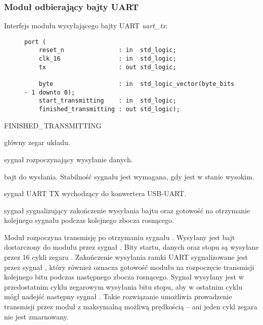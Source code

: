 \subsubsection{Moduł odbierający bajty UART}
Interfejs modułu wysyłającego bajty UART \textit{uart\_tx}:

\begin{figure}[!h]
\begin{lstlisting}[style=vhdl]
port (
	reset_n               : in  std_logic;
	clk_16                : in  std_logic;
	tx                    : out std_logic;

	byte                  : in  std_logic_vector(byte_bits - 1 downto 0);
	start_transmitting    : in  std_logic;
	finished_transmitting : out std_logic);
\end{lstlisting}
\end{figure}

\begin{interface}{FINISHED\_TRANSMITTING}
\item[\insignal{CLK\_16}] główny zegar układu.
\item[\insignal{START\_TRANSMITTING}] sygnał rozpoczynający wysyłanie danych.
\item[\insignal{BYTE[7:0]}] bajt do wysłania. Stabilność sygnału jest wymagana, gdy  jest w stanie wysokim.
\item[\outsignal{TX}] sygnał UART TX wychodzący do konwertera USB-UART.
\item[\outsignal{FINISHED\_TRANSMITTING}] sygnał sygnalizujący zakończenie wysyłania bajtu oraz gotowość na otrzymanie kolejnego sygnału  podczas kolejnego zbocza rosnącego.
\end{interface}

Moduł rozpoczyna transmisję po otrzymaniu sygnału . Wysyłany jest bajt dostarczony do modułu przez sygnał . Bity startu, danych oraz stopu są wysyłane przez 16 cykli zegara . Zakończenie wysyłania ramki UART sygnalizowane jest przez sygnał , który również oznacza gotowość modułu na rozpoczęcie transmisji kolejnego bitu podczas następnego zbocza rosnącego. Sygnał  wysyłany jest w przedostatnim cyklu zegarowym wysyłania bitu stopu, aby w ostatnim cyklu mógł nadejść następny sygnał . Takie rozwiązanie umożliwia prowadzenie transmisji przez moduł z maksymalną możliwą prędkością -- ani jeden cykl zegara nie jest zmarnowany.

